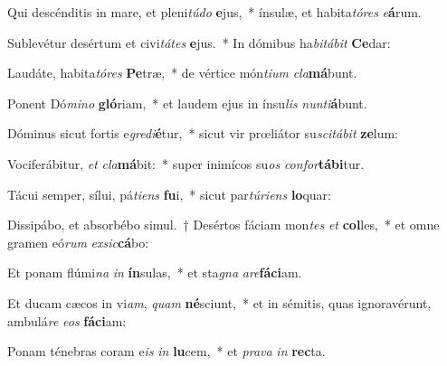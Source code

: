 \item Qui descénditis in mare, et pleni\textit{tú}\textit{do} \textbf{e}jus,~* ínsulæ, et habita\textit{tó}\textit{res} \textit{e}\textbf{á}rum.
\item Sublevétur desértum et civi\textit{tá}\textit{tes} \textbf{e}jus.~* In dómibus ha\textit{bi}\textit{tá}\textit{bit} \textbf{Ce}dar:
\item Laudáte, habita\textit{tó}\textit{res} \textbf{Pe}træ,~* de vértice món\textit{ti}\textit{um} \textit{cla}\textbf{má}bunt.
\item Ponent Dó\textit{mi}\textit{no} \textbf{gló}riam,~* et laudem ejus in ínsu\textit{lis} \textit{nun}\textit{ti}\textbf{á}bunt.
\item Dóminus sicut fortis e\textit{gre}\textit{di}\textbf{é}tur,~* sicut vir prœliátor su\textit{sci}\textit{tá}\textit{bit} \textbf{ze}lum:
\item Vociferábitur, \textit{et} \textit{cla}\textbf{má}bit:~* super inimícos su\textit{os} \textit{con}\textit{for}\textbf{tá}\textbf{bi}tur.
\item Tácui semper, sílui, pá\textit{ti}\textit{ens} \textbf{fu}i,~* sicut par\textit{tú}\textit{ri}\textit{ens} \textbf{lo}quar:
\item Dissipábo, et absorbébo simul.~† Desértos fáciam mon\textit{tes} \textit{et} \textbf{col}les,~* et omne gramen eó\textit{rum} \textit{ex}\textit{sic}\textbf{cá}bo:
\item Et ponam flúmi\textit{na} \textit{in} \textbf{ín}sulas,~* et sta\textit{gna} \textit{a}\textit{re}\textbf{fá}\textbf{ci}am.
\item Et ducam cæcos in vi\textit{am}, \textit{quam} \textbf{né}sciunt,~* et in sémitis, quas ignoravérunt, ambulá\textit{re} \textit{e}\textit{os} \textbf{fá}\textbf{ci}am:
\item Ponam ténebras coram e\textit{is} \textit{in} \textbf{lu}cem,~* et \textit{pra}\textit{va} \textit{in} \textbf{rec}ta.
